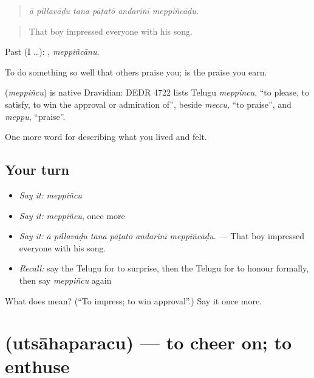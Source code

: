 \begin{quote}
\emph{ā pillavāḍu tana pāṭatō andarinī meppiñcāḍu.}
\end{quote}

\begin{quote}
That boy impressed everyone with his song.
\end{quote}

Past (I …): , \emph{meppiñcānu}.

To do something so well that others praise you;  is the praise you earn.

\begin{cousinweb}
\textbf{} (\emph{meppiñcu}) is native Dravidian: DEDR 4722 lists Telugu \emph{meppincu}, \textquotedblleft{}to please, to satisfy, to win the approval or admiration of\textquotedblright{}, beside \emph{meccu}, \textquotedblleft{}to praise\textquotedblright{}, and \emph{meppu}, \textquotedblleft{}praise\textquotedblright{}.
\end{cousinweb}

\begin{grammarlens}[title={What you've built}]
One more word for describing what you lived and felt.
\end{grammarlens}

\subsection*{Your turn}
\begin{itemize}
\raggedright
  \item \emph{Say it:} \emph{meppiñcu}
  \item \emph{Say it:} \emph{meppiñcu}, once more
  \item \emph{Say it:} \emph{ā pillavāḍu tana pāṭatō andarinī meppiñcāḍu.} — That boy impressed everyone with his song.
  \item \emph{Recall:} say the Telugu for to surprise, then the Telugu for to honour formally, then say \emph{meppiñcu} again
\end{itemize}

\begin{tcolorbox}[breakable,colback=teal!4,colframe=teal!35!black,title={Before you move on}]
What does  mean? (\textquotedblleft{}To impress; to win approval\textquotedblright{}.) Say it once more.
\end{tcolorbox}
\section[\texorpdfstring{\te{ఉత్సాహపరచు} (utsāhaparacu)}{ఉత్సాహపరచు (utsāhaparacu)}]{ (utsāhaparacu) — to cheer on; to enthuse}

